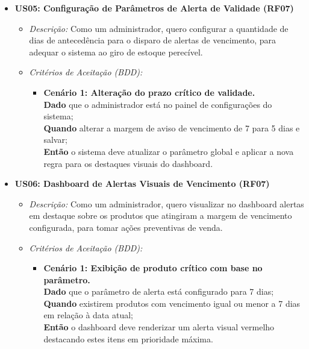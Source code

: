 \documentclass[
	12pt,				%
	openany,			%
	oneside,			%
	a4paper,			%
	english,			%
	french,				%
	spanish,			%
	brazil				%
	]{abntex2}
\begin{document}
\begin{itemize}
    \item \textbf{US05: Configuração de Parâmetros de Alerta de Validade (RF07)}
    \begin{itemize}
        \item \textit{Descrição:} Como um administrador, quero configurar a quantidade de dias de antecedência para o disparo de alertas de vencimento, para adequar o sistema ao giro de estoque perecível.
        \item \textit{Critérios de Aceitação (BDD):}
        \begin{itemize}
            \item \textbf{Cenário 1: Alteração do prazo crítico de validade.} \\
            \textbf{Dado} que o administrador está no painel de configurações do sistema; \\
            \textbf{Quando} alterar a margem de aviso de vencimento de 7 para 5 dias e salvar; \\
            \textbf{Então} o sistema deve atualizar o parâmetro global e aplicar a nova regra para os destaques visuais do dashboard.
        \end{itemize}
    \end{itemize}

    \item \textbf{US06: Dashboard de Alertas Visuais de Vencimento (RF07)}
    \begin{itemize}
        \item \textit{Descrição:} Como um administrador, quero visualizar no dashboard alertas em destaque sobre os produtos que atingiram a margem de vencimento configurada, para tomar ações preventivas de venda.
        \item \textit{Critérios de Aceitação (BDD):}
        \begin{itemize}
            \item \textbf{Cenário 1: Exibição de produto crítico com base no parâmetro.} \\
            \textbf{Dado} que o parâmetro de alerta está configurado para 7 dias; \\
            \textbf{Quando} existirem produtos com vencimento igual ou menor a 7 dias em relação à data atual; \\
            \textbf{Então} o dashboard deve renderizar um alerta visual vermelho destacando estes itens em prioridade máxima.
        \end{itemize}
    \end{itemize}


\end{itemize}
\end{document}
